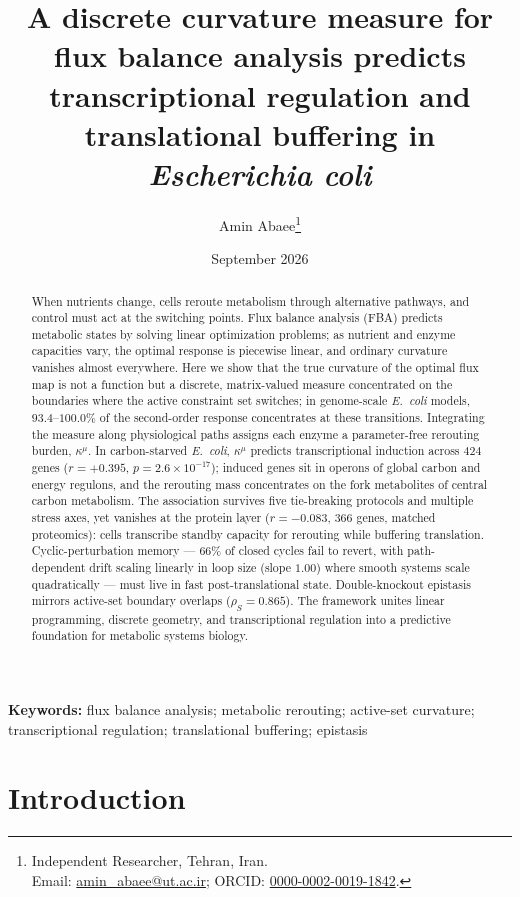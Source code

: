 \documentclass[11pt,a4paper]{article}
\title{A discrete curvature measure for flux balance analysis
       predicts transcriptional regulation and translational
       buffering in \emph{Escherichia coli}}
\author{Amin Abaee\thanks{Independent Researcher, Tehran, Iran.\\
  Email: \href{mailto:amin_abaee@ut.ac.ir}{amin\_abaee@ut.ac.ir}; ORCID:
  \href{https://orcid.org/0000-0002-0019-1842}{0000-0002-0019-1842}.}}
\date{September 2026}
\theoremstyle{plain}
\theoremstyle{definition}
\theoremstyle{remark}
\newcommand{\kmu}{\kappa^{\mu}}
\begin{document}
\linenumbers
\maketitle

\begin{abstract}
\noindent
When nutrients change, cells reroute metabolism through alternative
pathways, and control must act at the switching points. Flux balance
analysis (FBA) predicts metabolic states by solving linear
optimization problems; as nutrient and enzyme capacities vary, the
optimal response is piecewise linear, and ordinary curvature vanishes
almost everywhere. Here we show that the true curvature of the
optimal flux map is not a function but a discrete, matrix-valued
measure concentrated on the boundaries where the active constraint
set switches; in genome-scale \emph{E.~coli} models, $93.4$--$100.0\%$
of the second-order response concentrates at these transitions.
Integrating the measure along physiological paths assigns each enzyme
a parameter-free rerouting burden, $\kmu$. In carbon-starved
\emph{E.~coli}, $\kmu$ predicts transcriptional induction across
$424$ genes ($r = +0.395$, $p = 2.6 \times 10^{-17}$); induced genes
sit in operons of global carbon and energy regulons, and the
rerouting mass concentrates on the fork metabolites of central carbon
metabolism. The association survives five tie-breaking protocols and
multiple stress axes, yet vanishes at the protein layer
($r = -0.083$, $366$ genes, matched proteomics): cells transcribe
standby capacity for rerouting while buffering translation.
Cyclic-perturbation memory --- $66\%$ of closed cycles fail to
revert, with path-dependent drift scaling linearly in loop size
(slope $1.00$) where smooth systems scale quadratically --- must live
in fast post-translational state. Double-knockout epistasis mirrors
active-set boundary overlaps ($\rho_S = 0.865$). The framework
unites linear programming, discrete geometry, and transcriptional
regulation into a predictive foundation for metabolic systems
biology.
\end{abstract}

\medskip
\noindent\textbf{Keywords:} flux balance analysis; metabolic
rerouting; active-set curvature; transcriptional regulation;
translational buffering; epistasis

\bigskip

\section{Introduction}\label{sec:intro}
\end{document}
